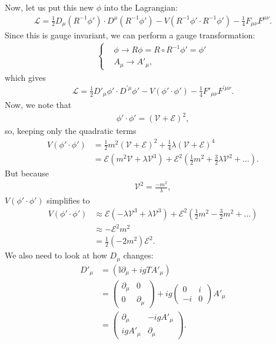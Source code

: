 \documentclass[a4paper,11pt]{article}
\numberwithin{equation}{section}
\theoremstyle{definition}
\newcommand{\p}{\partial}
\newcommand{\lag}{\mathcal{L}}
\begin{document}
Now, let us put this new $\phi$ into the Lagrangian:
\begin{align}
\lag = \frac{1}{2}D_\mu (R^{-1}\phi')\cdot D^{\mu}(R^{-1}\phi') - V(R^{-1}\phi' \cdot R^{-1}\phi') - \frac{1}{4}F_{\mu\nu}F^{\mu\nu}.
\end{align} 
Since this is gauge invariant, we can perform a gauge transformation:
\begin{align}
\begin{cases}
&\phi \to R\phi = R\circ R^{-1}\phi' = \phi'\\
&A_\mu \to A'_\mu,
\end{cases}
\end{align}
which gives
\begin{align}
\lag = \frac{1}{2}D'_\mu \phi' \cdot D^{'\mu}\phi' - V(\phi'\cdot \phi')- \frac{1}{4}F'_{\mu\nu}F^{'\mu\nu}.
\end{align}
Now, we note that 
\begin{align}
\phi'\cdot\phi' = (\mathcal{V} + \mathcal{E})^2,
\end{align}
so, keeping only the quadratic terms
\begin{align}
V(\phi'\cdot \phi') &= \frac{1}{2}m^2(\mathcal{V} + \mathcal{E})^2 + \frac{1}{4}\lambda (\mathcal{V} + \mathcal{E})^4\\
&=\mathcal{E}(m^2\mathcal{V} + \lambda \mathcal{V}^3) + \mathcal{E}^2\left(\frac{1}{2}m^2 + \frac{3}{2}\lambda \mathcal{V}^2 + \dots\right).
\end{align}
But because
\begin{align}
\mathcal{V}^2 = \frac{-m^2}{\lambda},
\end{align}
$V(\phi'\cdot \phi')$ simplifies to
\begin{align}
V(\phi' \cdot \phi') &\approx \mathcal{E}(-\lambda \mathcal{V}^3 + \lambda \mathcal{V}^3) + \mathcal{E}^2\left(\frac{1}{2}m^2 - \frac{3}{2}m^2 + \dots\right)\\
&\approx -\mathcal{E}^2m^2\\
&= \frac{1}{2}(-2m^2)\mathcal{E}^2.
\end{align}
We also need to look at how $D_\mu$ changes:
\begin{align}
D'_\mu &= (\mathbb{I}\p_\mu + ig TA'_\mu)\\
&= \begin{pmatrix}
\p_\mu & 0 \\
0& \p_\mu
\end{pmatrix} +
ig\begin{pmatrix}
0 & i \\
-i & 0
\end{pmatrix}A'_\mu\\
&= \begin{pmatrix}
\p_\mu & -igA'_\mu\\
igA'_\mu &  \p_\mu
\end{pmatrix}.
\end{align}
\end{document}
